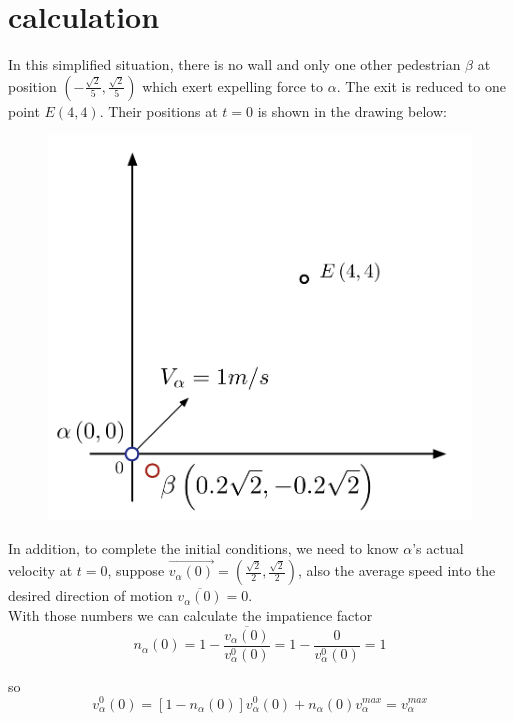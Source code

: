 \section{calculation}
In this simplified situation, there is no wall and only one other pedestrian $\beta$ at position $(-\frac{\sqrt{2}}{5}, \frac{\sqrt{2}}{5})$ which exert expelling force to $\alpha$.  The exit is reduced to one point $E(4,4)$.  Their positions at $t=0$ is shown in the drawing below:\\

\begin{figure}
\centering
{\includegraphics[scale=0.45]{Figures/calculation.pdf}} 
\caption{\small{}\label{calc}}
\end{figure}

In addition, to complete the initial conditions, we need to know $\alpha$'s actual velocity at $t=0$, suppose $\overrightarrow{v_{\alpha}(0)}=(\frac{\sqrt{2}}{2}, \frac{\sqrt{2}}{2})$, also the average speed into the desired direction of motion $\overline{v_{\alpha}(0)}=0$.\\

With those numbers we can calculate the impatience factor 
 \begin{equation}
 n_{\alpha}(0)=1-\frac{\overline{v_{\alpha}(0)}}{v^{0}_{\alpha}(0)}=1-\dfrac{0}{v^{0}_{\alpha}(0)}=1
 \end{equation}

so 
 \begin{equation}
 v^{0}_{\alpha}(0)=[1-n_{\alpha}(0)]v^{0}_{\alpha}(0) + n_{\alpha}(0)v_{\alpha}^{max} = v_{\alpha}^{max}
 \end{equation}
 
